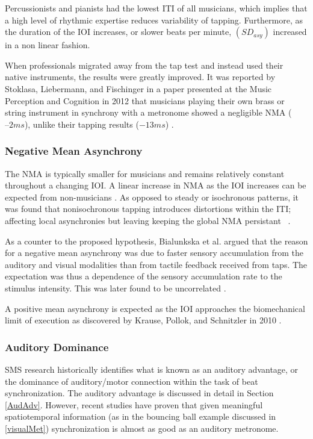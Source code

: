 Percussionists and pianists had the lowest ITI of all musicians, which implies that a high level of rhythmic expertise reduces variability of tapping. Furthermore, as the duration of the IOI increases, or slower beats per minute, $(SD_{asy})$ increased in a non linear fashion. 

When professionals migrated away from the tap test and instead used their native instruments, the results were greatly improved. It was reported by Stoklasa, Liebermann, and Fischinger in a paper presented at the Music Perception and Cognition in 2012 that musicians playing their own brass or string instrument in synchrony with a metronome showed a negligible NMA ($–2 ms$), unlike their tapping results ($-13 ms$) \cite{repp2013sensorimotor}.

\subsubsection{Negative Mean Asynchrony}
The NMA is typically smaller for musicians and remains relatively constant throughout a changing IOI. A linear increase in NMA as the IOI increases can be expected from non-musicians \cite{repp2013sensorimotor}. As opposed to steady or isochronous patterns, it was found that nonisochronous tapping introduces distortions within the ITI; affecting local asynchronies but leaving keeping the global NMA persistant ~\cite{polak2016both}.
 
As a counter to the proposed hypothesis, Bialunkska et al. argued that the reason for a negative mean asynchrony was due to faster sensory accumulation from the auditory and visual modalities than from tactile feedback received from taps. The expectation was thus a dependence of the sensory accumulation rate to the stimulus intensity. This was later found to be uncorrelated \cite{bialunska2011increasing}.

A positive mean asynchrony is expected as the IOI approaches the biomechanical limit of execution as discovered by Krause, Pollok, and Schnitzler in 2010 \cite{krause2010perception}.

\subsubsection{Auditory Dominance}
SMS research historically identifies what is known as an auditory advantage, or the dominance of auditory/motor connection within the task of beat synchronization. The auditory advantage is discussed in detail in Section \ref{AudAdv}. However, recent studies have proven that given meaningful spatiotemporal information (as in the bouncing ball example discussed in \ref{visualMet}) synchronization is almost as good as an auditory metronome.

